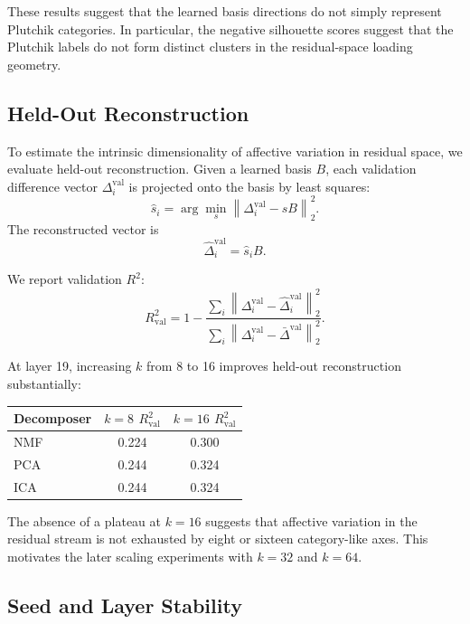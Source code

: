 \documentclass[12pt,twoside]{report}
\begin{document}
These results suggest that the learned basis directions do not simply represent Plutchik categories. In particular, the negative silhouette scores suggest that the Plutchik labels do not form distinct clusters in the residual-space loading geometry.

\subsection{Held-Out Reconstruction}
\label{sec:emotion_code:basis:reconstruction}

To estimate the intrinsic dimensionality of affective variation in residual space, we evaluate held-out reconstruction. Given a learned basis $B$, each validation difference vector $\Delta_i^{\mathrm{val}}$ is projected onto the basis by least squares:
\begin{equation}
\hat{s}_i
=
\arg\min_s
\left\|
\Delta_i^{\mathrm{val}} - sB
\right\|_2^2.
\end{equation}
The reconstructed vector is
\begin{equation}
\widehat{\Delta}_i^{\mathrm{val}}
=
\hat{s}_i B.
\end{equation}

We report validation $R^2$:
\begin{equation}
R^2_{\mathrm{val}}
=
1 -
\frac{
\sum_i
\left\|
\Delta_i^{\mathrm{val}}
-
\widehat{\Delta}_i^{\mathrm{val}}
\right\|_2^2
}{
\sum_i
\left\|
\Delta_i^{\mathrm{val}}
-
\bar{\Delta}^{\mathrm{val}}
\right\|_2^2
}.
\end{equation}

At layer 19, increasing $k$ from 8 to 16 improves held-out reconstruction
substantially:
\begin{center}
\begin{tabular}{lcc}
\toprule
Decomposer & $k=8$ $R^2_{\mathrm{val}}$ & $k=16$ $R^2_{\mathrm{val}}$ \\
\midrule
NMF & 0.224 & 0.300 \\
PCA & 0.244 & 0.324 \\
ICA & 0.244 & 0.324 \\
\bottomrule
\end{tabular}
\end{center}

The absence of a plateau at $k=16$ suggests that affective variation in
the residual stream is not exhausted by eight or sixteen category-like
axes. This motivates the later scaling experiments with $k=32$ and
$k=64$.

\subsection{Seed and Layer Stability}
\label{sec:emotion_code:basis:stability}
\end{document}
